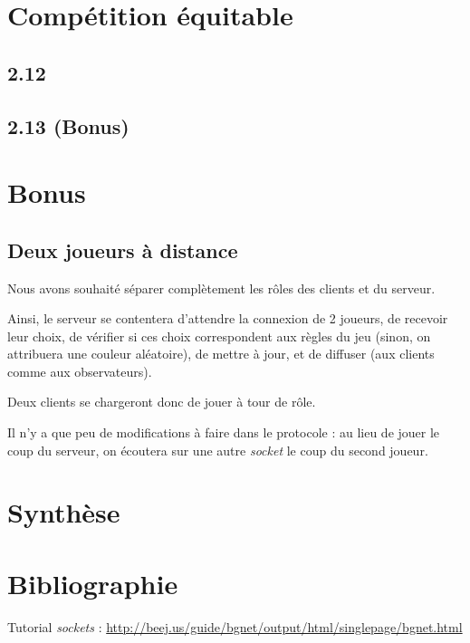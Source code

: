 \documentclass[12pt]{article}
\def\question#1{\subsection{#1}}
\def\sec#1{\section{#1}}
\begin{document}
\sec{Compétition équitable}
\question{2.12}
\question{2.13 (Bonus)}

\sec{Bonus}
\question{Deux joueurs à distance}
Nous avons souhaité séparer complètement les rôles des clients et du serveur.

Ainsi, le serveur se contentera d'attendre la connexion de 2 joueurs, de recevoir leur choix, de vérifier si ces choix correspondent aux règles du jeu (sinon, on attribuera une couleur aléatoire), de mettre à jour, et de diffuser (aux clients comme aux observateurs).

Deux clients se chargeront donc de jouer à tour de rôle.

Il n'y a que peu de modifications à faire dans le protocole : au lieu de jouer le coup du serveur, on écoutera sur une autre \textit{socket} le coup du second joueur.

\sec{Synthèse}

\sec{Bibliographie}
Tutorial \textit{sockets} : \url{http://beej.us/guide/bgnet/output/html/singlepage/bgnet.html}
\end{document}
